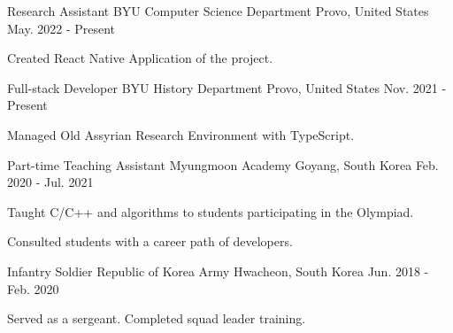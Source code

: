 

\begin{cventries}

  \cventry
  {Research Assistant} %
  {BYU Computer Science Department} %
  {Provo, United States} %
  {May. 2022 - Present} %
  {
    \begin{cvitems} %
      \item {Created React Native Application of the project.}
    \end{cvitems}
  }

  \cventry
  {Full-stack Developer} %
  {BYU History Department} %
  {Provo, United States} %
  {Nov. 2021 - Present} %
  {
    \begin{cvitems} %
      \item {Managed Old Assyrian Research Environment with TypeScript.}
    \end{cvitems}
  }

  \cventry
  {Part-time Teaching Assistant} %
  {Myungmoon Academy} %
  {Goyang, South Korea} %
  {Feb. 2020 - Jul. 2021} %
  {
    \begin{cvitems} %
      \item {Taught C/C++ and algorithms to students participating in the Olympiad.}
      \item {Consulted students with a career path of developers.}
    \end{cvitems}
  }

  \cventry
  {Infantry Soldier} %
  {Republic of Korea Army} %
  {Hwacheon, South Korea} %
  {Jun. 2018 - Feb. 2020} %
  {
    \begin{cvitems} %
      \item {Served as a sergeant. Completed squad leader training.}
    \end{cvitems}
  }

\end{cventries}
